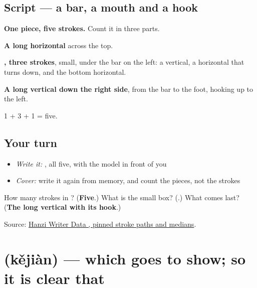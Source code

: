 \subsection*{Script — a bar, a mouth and a hook}

\begin{quote}
\end{quote}

\textbf{One piece, five strokes.} Count it in three parts.

\textbf{A long horizontal} across the top.

\textbf{, three strokes}, small, under the bar on the left: a vertical, a horizontal that turns down, and the bottom horizontal.

\textbf{A long vertical down the right side}, from the bar to the foot, hooking up to the left.

1 + 3 + 1 = five.

\subsection*{Your turn}
\begin{itemize}
\raggedright
  \item \emph{Write it:} , all five, with the model in front of you
  \item \emph{Cover:} write it again from memory, and count the pieces, not the strokes
\end{itemize}

\begin{tcolorbox}[breakable,colback=teal!4,colframe=teal!35!black,title={Before you move on}]
How many strokes in ? (\textbf{Five}.) What is the small box? (\textbf{}.) What comes last? (\textbf{The long vertical with its hook}.)

Source: \href{https://raw.githubusercontent.com/chanind/hanzi-writer-data/68d10a4b21150cae5e1ebbd223eed289cf32d90c/data/\%E5\%8F\%AF.json}{Hanzi Writer Data , pinned stroke paths and medians}.
\end{tcolorbox}
\section[\texorpdfstring{\zh{可见} (kějiàn)}{可见 (kějiàn)}]{ (kějiàn) — which goes to show; so it is clear that}

\label{lesson:ZH-C365-kejian}



